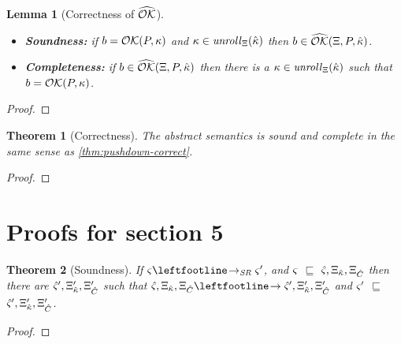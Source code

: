 \documentclass{article}
\newtheorem{theorem}{Theorem}
\newtheorem{lemma}{Lemma}
\begin{document}
\begin{lemma}[Correctness of $\widehat{{\mathcal O}{\mathcal K}}$]
  \begin{itemize}
  \item{\textbf{Soundness:} if $b = {\mathcal O}{\mathcal K}(P,\kappa)$ and $\kappa \in \mathit{unroll}_{\Xi}({\hat{\kappa}})$ then $b \in \widehat{{\mathcal O}{\mathcal K}}(\Xi,P,{\hat{\kappa}})$.}
  \item{\textbf{Completeness:} if $b \in \widehat{{\mathcal O}{\mathcal K}}(\Xi,P,{\hat{\kappa}})$ then there is a $\kappa \in \mathit{unroll}_{\Xi}({\hat{\kappa}})$ such that $b = {\mathcal O}{\mathcal K}(P,\kappa)$.}
  \end{itemize}
\end{lemma}
\begin{proof}
\end{proof}

\begin{theorem}[Correctness]
  The abstract semantics is sound and complete in the same sense as \autoref{thm:pushdown-correct}.
\end{theorem}
\begin{proof}
\end{proof}

\section{Proofs for section 5}

\begin{theorem}[Soundness]
  If $\mstate \stepto_{\SR} \mstate'$, and $\varsigma$ $\sqsubseteq$ $\hat\varsigma,\Xi_{{\hat{\kappa}}},\Xi_{{\hat{C}}}$ then there are $\hat\varsigma',\Xi_{{\hat{\kappa}}}',\Xi_{{\hat{C}}}'$ such that $\mastate,\mktab_{\makont},\mktab_{\mamkont} \stepto \mastate',\mktab_{\makont}',\mktab_{\mamkont}'$ and
$\varsigma'$ $\sqsubseteq$ $\hat\varsigma',\Xi_{{\hat{\kappa}}}',\Xi_{{\hat{C}}}'$.
\end{theorem}
\begin{proof}
\end{proof}
\end{document}
